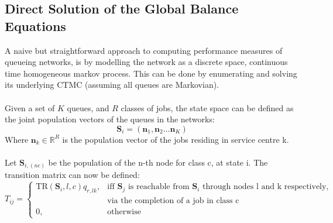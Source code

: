 \subsection{Direct Solution of the Global Balance Equations}
A naive but straightforward approach to computing performance measures of queueing networks, is by modelling the network as a discrete space, continuous time homogeneous markov process. This can be done by enumerating and solving its underlying CTMC (assuming all queues are Markovian).
\\\\
Given a set of \(K\) queues, and \(R\) classes of jobs, the state space can be defined as the joint population vectors of the queues in the networks:
\begin{equation}
    \mathbf{S}_i = (\mathbf{n}_1, \mathbf{n}_2 ... \mathbf{n}_K)
\end{equation}
Where \(\mathbf{n}_k \in \mathbb{R}^R\) is the population vector of the jobs residing in service centre k.
\\\\
Let \(\mathbf{S}_{i,(nc)}\) be the population of the n-th node for class c, at state i. The transition matrix can now be defined:
\begin{equation*}
    T_{ij}=
    \begin{cases}
        \text{TR}(\mathbf{S}_i, l, c)q_{r,lk}, & \text{iff } \mathbf{S}_j \text{ is reachable from } \mathbf{S}_i \text{ through nodes l and k respectively, }\\  & \text{via the completion of a job in class c}\\
        0, & \text{otherwise}
    \end{cases}
\end{equation*}

